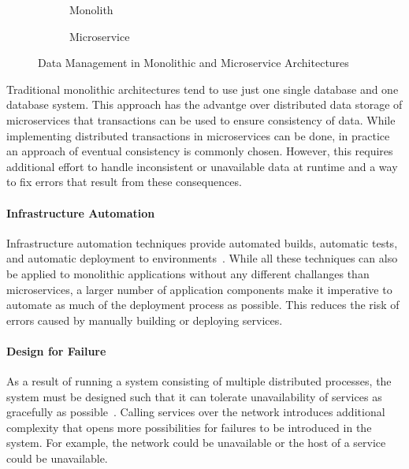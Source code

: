 \begin{figure}[!htb]
    \centering
    \begin{subfigure}{.5\textwidth}
        \centering
        
        \caption{Monolith}
        \label{fig:sub1}
    \end{subfigure}%
    \begin{subfigure}{.5\textwidth}
        \centering
        
        \caption{Microservice}
        \label{fig:sub2}
    \end{subfigure}
    \caption{Data Management in Monolithic and Microservice Architectures~\cite{Lewis2014}}
    \label{fig:test}
\end{figure}

Traditional monolithic architectures tend to use just one single database and one database system.
This approach has the advantge over distributed data storage of microservices that transactions can be used to ensure consistency of data.
While implementing distributed transactions in microservices can be done, in practice an approach of eventual consistency is commonly chosen.
However, this requires additional effort to handle inconsistent or unavailable data at runtime and a way to fix errors that result from these consequences. 

\paragraph{Infrastructure Automation}

Infrastructure automation techniques provide automated builds, automatic tests, and automatic deployment to environments~\cite{Lewis2014}.
While all these techniques can also be applied to monolithic applications without any different challanges than microservices, a larger number of application components make it imperative to automate as much of the deployment process as possible.
This reduces the risk of errors caused by manually building or deploying services.

\paragraph{Design for Failure}

As a result of running a system consisting of multiple distributed processes, the system must be designed such that it can tolerate unavailability of services as gracefully as possible~\cite{Lewis2014}.
Calling services over the network introduces additional complexity that opens more possibilities for failures to be introduced in the system.
For example, the network could be unavailable or the host of a service could be unavailable.

